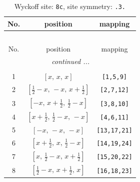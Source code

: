 \documentclass[fleqn,8pt]{jsarticle}
\begin{document}
\renewcommand{\arraystretch}{1.2}
\begin{longtable}{ccc}
\caption{Wyckoff site: {\tt 8c}, site symmetry: {\tt .3.}}
 \\
 \hline \hline
No. & position & mapping \\ \hline \endfirsthead

\multicolumn{2}{l}{\tablename\ \thetable{}} \\
 \hline \hline
No. & position & mapping \\ \hline \endhead

 \hline \hline
\multicolumn{2}{r}{\footnotesize\it continued ...} \\ \endfoot

 \hline \hline
\multicolumn{2}{r}{} \\ \endlastfoot

1 & $\left[ x,\, x,\, x \right]$ & {\tt [1,5,9]} \\ \hline
2 & $\left[ \frac{1}{2} - x,\, - x,\, x + \frac{1}{2} \right]$ & {\tt [2,7,12]} \\ \hline
3 & $\left[ - x,\, x + \frac{1}{2},\, \frac{1}{2} - x \right]$ & {\tt [3,8,10]} \\ \hline
4 & $\left[ x + \frac{1}{2},\, \frac{1}{2} - x,\, - x \right]$ & {\tt [4,6,11]} \\ \hline
5 & $\left[ - x,\, - x,\, - x \right]$ & {\tt [13,17,21]} \\ \hline
6 & $\left[ x + \frac{1}{2},\, x,\, \frac{1}{2} - x \right]$ & {\tt [14,19,24]} \\ \hline
7 & $\left[ x,\, \frac{1}{2} - x,\, x + \frac{1}{2} \right]$ & {\tt [15,20,22]} \\ \hline
8 & $\left[ \frac{1}{2} - x,\, x + \frac{1}{2},\, x \right]$ & {\tt [16,18,23]} \\
\end{longtable}
\renewcommand{\arraystretch}{1.2}
\end{document}
